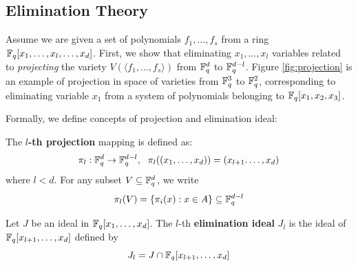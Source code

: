\subsection{Elimination Theory}
Assume we are given a set of polynomials $f_1,\dots,f_s$ from a ring ${\mathbb{F}}_{q}[x_1,\dots,x_l,\dots,x_d]$.
First, we show that eliminating $x_1,\dots,x_l$ variables related to 
{\it projecting} the variety $V(\langle f_1,\dots,f_s\rangle)$ from 
${\mathbb{F}}_{q}^d$ to ${\mathbb{F}}_{q}^{d-l}$. Figure \ref{fig:projection} is an example of projection in space of varieties
from ${\mathbb{F}}_{q}^3$ to ${\mathbb{F}}_{q}^2$, corresponding to eliminating variable $x_1$ from 
a system of polynomials belonging to ${\mathbb{F}}_{q}[x_1,x_2,x_3]$.

\begin{figure}[H]
\end{figure}

Formally, we define concepts of projection and elimination ideal:
\begin{Definition}
The {\bf $l$-th projection} mapping is defined as:
$$\pi_l:{\mathbb{F}}_{q}^d\to{\mathbb{F}}_{q}^{d-l},~~\pi_l((x_1,\dots,x_d)) = (x_{l+1}.\dots,x_d)$$
where $l<d$. For any subset $V \subseteq {\mathbb{F}}_{q}^d$, we write 
$$\pi_l(V) = \{\pi_i(x):x\in A\}\subseteq {\mathbb{F}}_{q}^{d-l}$$
\end{Definition}

\begin{Definition}
Let $J$ be an ideal in  ${\mathbb{F}}_{q}[x_1,\dots,x_d]$. The $l$-th 
{\bf elimination ideal} $J_l$ is the ideal of ${\mathbb{F}}_{q}[x_{l+1},\dots,x_d]$ defined
by
\begin{equation}
J_l = J \cap {\mathbb{F}}_{q}[x_{l+1},\dots,x_d]
\end{equation}
\end{Definition}

